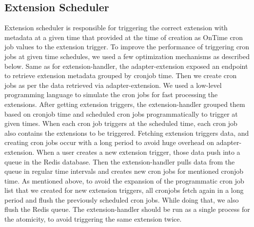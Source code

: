 \subsection{Extension Scheduler}

Extension scheduler is responsible for triggering the correct extension with metadata at a given time that provided at the time of creation as OnTime cron job values to the extension trigger. To improve the performance of triggering cron jobs at given time schedules, we used a few optimization mechanisms as described below. 
Same as for extension-handler, the adapter-extension exposed an endpoint to retrieve extension metadata grouped by cronjob time. Then we create cron jobs as per the data retrieved via adapter-extension. We used a low-level programming language to simulate the cron jobs for fast processing the extensions. After getting extension triggers, the extension-handler grouped them based on cronjob time and scheduled cron jobs programmatically to trigger at given times. 
When each cron job triggers at the scheduled time, each cron job also contains the extensions to be triggered. Fetching extension triggers data, and creating cron jobs occur with a long period to avoid huge overhead on adapter-extension. When a user creates a new extension trigger, those data push into a queue in the Redis database. Then the extension-handler pulls data from the queue in regular time intervals and creates new cron jobs for mentioned cronjob time. 
As mentioned above, to avoid the expansion of the programmatic cron job list that we created for new extension triggers, all cronjobs fetch again in a long period and flush the previously scheduled cron jobs. While doing that, we also flush the Redis queue.
The extension-handler should be run as a single process for the atomicity, to avoid triggering the same extension twice.